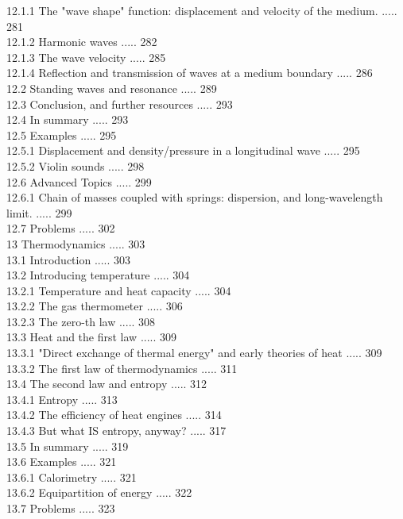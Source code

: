 \documentclass[10pt]{article}
\begin{document}
12.1.1 The "wave shape" function: displacement and velocity of the medium. ..... 281\\
12.1.2 Harmonic waves ..... 282\\
12.1.3 The wave velocity ..... 285\\
12.1.4 Reflection and transmission of waves at a medium boundary ..... 286\\
12.2 Standing waves and resonance ..... 289\\
12.3 Conclusion, and further resources ..... 293\\
12.4 In summary ..... 293\\
12.5 Examples ..... 295\\
12.5.1 Displacement and density/pressure in a longitudinal wave ..... 295\\
12.5.2 Violin sounds ..... 298\\
12.6 Advanced Topics ..... 299\\
12.6.1 Chain of masses coupled with springs: dispersion, and long-wavelength limit. ..... 299\\
12.7 Problems ..... 302\\
13 Thermodynamics ..... 303\\
13.1 Introduction ..... 303\\
13.2 Introducing temperature ..... 304\\
13.2.1 Temperature and heat capacity ..... 304\\
13.2.2 The gas thermometer ..... 306\\
13.2.3 The zero-th law ..... 308\\
13.3 Heat and the first law ..... 309\\
13.3.1 "Direct exchange of thermal energy" and early theories of heat ..... 309\\
13.3.2 The first law of thermodynamics ..... 311\\
13.4 The second law and entropy ..... 312\\
13.4.1 Entropy ..... 313\\
13.4.2 The efficiency of heat engines ..... 314\\
13.4.3 But what IS entropy, anyway? ..... 317\\
13.5 In summary ..... 319\\
13.6 Examples ..... 321\\
13.6.1 Calorimetry ..... 321\\
13.6.2 Equipartition of energy ..... 322\\
13.7 Problems ..... 323
\end{document}

